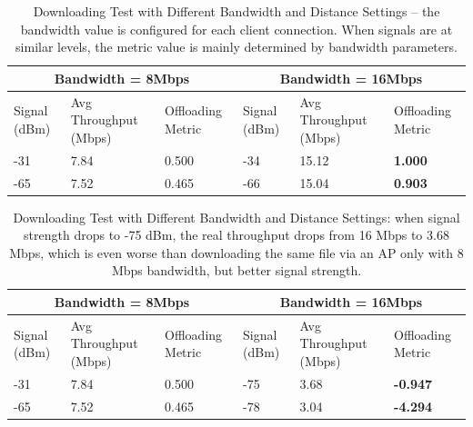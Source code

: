 \documentclass[english]{tktltiki}
\begin{document}
\begin{table}[htbp]
\centering
\begin{tabular}{|p{35pt}|p{84pt}|p{50pt}|p{35pt}|p{84pt}|p{50pt}|}
  \hline
  \multicolumn{3}{|c|}{Bandwidth = 8Mbps} & \multicolumn{3}{c|}{Bandwidth = 16Mbps} \\
  \hline
  Signal (dBm) & Avg Throughput (Mbps) & Offloading Metric & Signal (dBm) & Avg Throughput (Mbps) & Offloading Metric \\
  \hline
  -31 & 7.84 & 0.500 & -34 & 15.12 & \textbf{1.000} \\
  \hline
  -65 & 7.52 & 0.465 & -66 & 15.04 & \textbf{0.903} \\
  \hline
\end{tabular}
\caption{Downloading Test with Different Bandwidth and Distance Settings -- the bandwidth value is configured for each client connection. When signals are at similar levels, the metric value is mainly determined by bandwidth parameters.}
\label{tab:combination-test-1}
\end{table}

\begin{table}[htbp]
\centering
\begin{tabular}{|p{35pt}|p{84pt}|p{50pt}|p{35pt}|p{84pt}|p{50pt}|}
  \hline
  \multicolumn{3}{|c|}{Bandwidth = 8Mbps} & \multicolumn{3}{c|}{Bandwidth = 16Mbps} \\
  \hline
  Signal (dBm) & Avg Throughput (Mbps) & Offloading Metric & Signal (dBm) & Avg Throughput (Mbps) & Offloading Metric \\
  \hline
  -31 & 7.84 & 0.500 & -75 & 3.68 & \textbf{-0.947} \\
  \hline
  -65 & 7.52 & 0.465 & -78 & 3.04 & \textbf{-4.294} \\
  \hline
\end{tabular}
\caption{Downloading Test with Different Bandwidth and Distance Settings: when signal strength drops to -75 dBm, the real throughput drops from 16 Mbps to 3.68 Mbps, which is even worse than downloading the same file via an AP only with 8 Mbps bandwidth, but better signal strength.}
\label{tab:combination-test-2}
\end{table}
\end{document}
